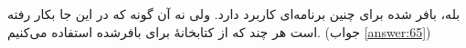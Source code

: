 \section{}
\paragraph{}\label{hint:127}
بله،  بافر شده برای چنین برنامه‌ای کاربرد دارد. ولی نه آن گونه که در این جا بکار رفته است هر چند که از کتابخانهٔ  برای  بافرشده استفاده می‌کنیم. (جواب \ref{answer:65})